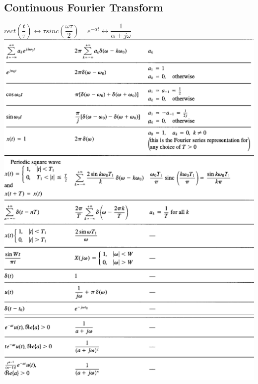 \documentclass[]{article}
\begin{document}
\begin{multicols}{2}
    \section*{Continuous Fourier Transform}
    $rect(\dfrac{t}{\tau}) \leftrightarrow \tau sinc(\dfrac{\omega \tau}{2})$ ~
    $e^{-\alpha t} \leftrightarrow \dfrac{1}{\alpha + j \omega}$\\
    \includegraphics[scale=0.25]{continuous2.png}\\
    \includegraphics[scale=0.25]{continuous3.png}\\
    \includegraphics[scale=0.25]{continuous4.png}\\
    \newpage

\end{multicols}
\end{document}
